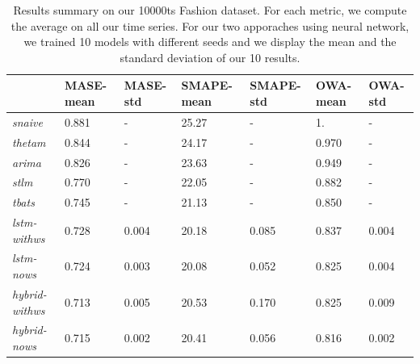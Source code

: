 \documentclass{article} %
\newcommand{\predictor}{\mathrm{RNN}_p}
\newcommand{\classifier}{\mathrm{RNN}_c}
\begin{document}

\begin{table}
  \caption{Results summary on our 10000ts Fashion dataset. For each metric, we compute the average on all our time series. For our two apporaches using neural network, we trained 10 models with different seeds and we display the mean and the standard deviation of our 10 results.}
  \centering
  \begin{tabular}{lllllll}
    \hline
    &  MASE-mean  & MASE-std & SMAPE-mean & SMAPE-std & OWA-mean & OWA-std  \\
    \hline
     \textit{snaive} & 0.881 & - & 25.27 & - & 1. & -\\
     \textit{thetam}  & 0.844 & - & 24.17 & - & 0.970 & -\\
     \textit{arima} & 0.826 & - & 23.63 & - & 0.949 & -\\
     \textit{stlm} & 0.770 & - & 22.05 & - & 0.882 & -\\
     \textit{tbats} & 0.745 & - & 21.13 & - & 0.850 & -\\
     \textit{lstm-withws} & 0.728 & 0.004 & 20.18 & 0.085 & 0.837 & 0.004\\
     \textit{lstm-nows} & 0.724 & 0.003 & 20.08 & 0.052  & 0.825 & 0.004\\
     \textit{hybrid-withws} & 0.713 & 0.005 & 20.53 & 0.170 & 0.825 & 0.009\\
     \textit{hybrid-nows} & 0.715 & 0.002 & 20.41 & 0.056 & 0.816 & 0.002\\
    \hline
  \end{tabular}
\label{tab:metricresults}
\end{table}
\end{document}

